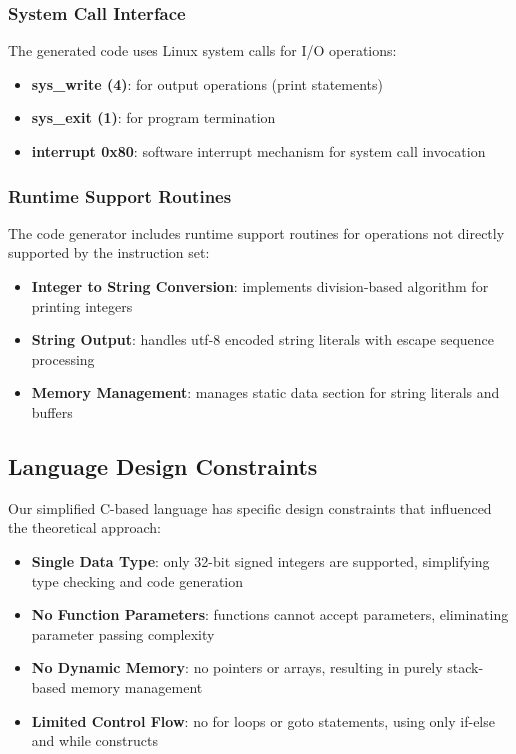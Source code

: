 \documentclass[12pt, letterpaper]{article}
\begin{document}
\subsubsection*{System Call Interface}

The generated code uses Linux system calls for I/O operations:

\begin{itemize}
    \item \textbf{sys\_write (4)}: for output operations (print statements)
    \item \textbf{sys\_exit (1)}: for program termination
    \item \textbf{interrupt 0x80}: software interrupt mechanism for system call invocation
\end{itemize}

\subsubsection*{Runtime Support Routines}

The code generator includes runtime support routines for operations not directly supported by the instruction set:

\begin{itemize}
    \item \textbf{Integer to String Conversion}: implements division-based algorithm for printing integers
    \item \textbf{String Output}: handles utf-8 encoded string literals with escape sequence processing
    \item \textbf{Memory Management}: manages static data section for string literals and buffers
\end{itemize}

\subsection*{Language Design Constraints}

Our simplified C-based language has specific design constraints that influenced the theoretical approach:

\begin{itemize}
    \item \textbf{Single Data Type}: only 32-bit signed integers are supported, simplifying type checking and code generation
    \item \textbf{No Function Parameters}: functions cannot accept parameters, eliminating parameter passing complexity
    \item \textbf{No Dynamic Memory}: no pointers or arrays, resulting in purely stack-based memory management
    \item \textbf{Limited Control Flow}: no for loops or goto statements, using only if-else and while constructs
\end{itemize}
\end{document}
